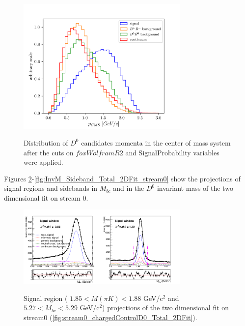 \begin{figure}[H]
{\includegraphics[width=0.75\textwidth]{A2-Appendix/figs/chargedBtoD0bar_Pcms_afterOpt.png}}
\caption{Distribution of  $D^0$ candidates momenta in the center of mass system after the cuts on $foxWolframR2$ 
and SignalProbability variables were applied.}
\label{fig:chargedcorrD0_Pcms}
\end{figure}
   

Figures \ref{fig:stream0Signal_window_chargedControlD0_Total_2DFit}-\ref{fig:InvM_Sideband_Total_2DFit_stream0} show the projections of signal regions and sidebands in $ M_{bc}$ and in the $D^0$ invariant mass of the two dimensional fit on stream 0.

\begin{figure}[H]
{\includegraphics[width=0.75\textwidth]{A2-Appendix/figs/stream0Signal_window_chargedControlD0_Total_2DFit.png}}
\caption{Signal region ( $1.85 < M(\pi K) < 1.88$ GeV/c$^2$ and $5.27 < M_{bc} < 5.29$ GeV/c$^2$) projections of the two dimensional fit on stream0 (\cref{fig:stream0_chargedControlD0_Total_2DFit}).}
\label{fig:stream0Signal_window_chargedControlD0_Total_2DFit}
\end{figure}
 

